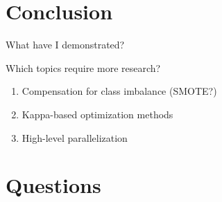 \documentclass[ignorenonframetext,]{beamer}
\providecommand{\tightlist}{%
\setlength{\itemsep}{0pt}\setlength{\parskip}{0pt}}
\begin{document}
\section{Conclusion}\label{conclusion}

\begin{frame}{What have I demonstrated?}

\end{frame}

\begin{frame}{Which topics require more research?}

\begin{enumerate}
\def\labelenumi{\arabic{enumi}.}
\tightlist
\item
  Compensation for class imbalance (SMOTE?)
\item
  Kappa-based optimization methods
\item
  High-level parallelization
\end{enumerate}

\end{frame}

\section{Questions}\label{questions}
\end{document}
